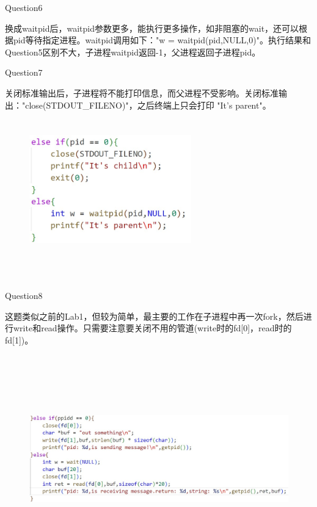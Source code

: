 \documentclass[12pt]{article}
\begin{document}
\begin{large}
    \noindent Question6\\
\end{large}
\hspace*{2em}换成waitpid后，waitpid参数更多，能执行更多操作，如非阻塞的wait，还可以根据pid等待指定进程。waitpid调用如下："w = waitpid(pid,NULL,0)"。执行结果和Question5区别不大，子进程waitpid返回-1，父进程返回子进程pid。
\newpage
\begin{large}
    \noindent Question7\\
\end{large}
\hspace*{2em}关闭标准输出后，子进程将不能打印信息，而父进程不受影响。关闭标准输出："close(STDOUT\_FILENO)"，之后终端上只会打印 "It's parent"。
\begin{figure}[h]
    \centering
    \includegraphics*[height=6cm,width=7cm]{HW2-16.jpg}
\end{figure}\\
\begin{large}
    \noindent Question8\\
\end{large}
\hspace*{2em}这题类似之前的Lab1，但较为简单，最主要的工作在子进程中再一次fork，然后进行write和read操作。只需要注意要关闭不用的管道(write时的fd[0]，read时的fd[1])。
\begin{figure}[h]
    \centering
    \includegraphics*[height=9cm,width=14cm]{HW2-17.jpg}
\end{figure}
\end{document}
